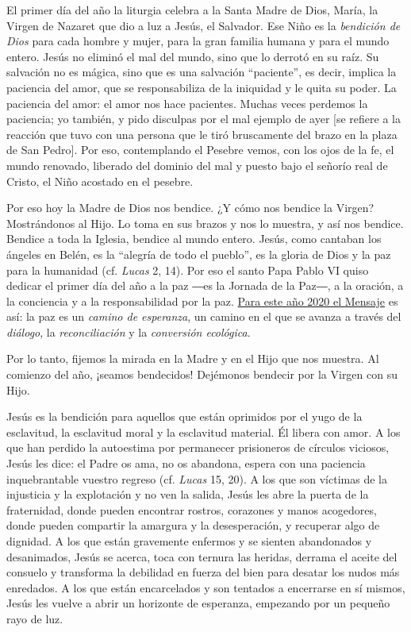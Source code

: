El primer día del año la liturgia celebra a la Santa Madre de Dios,
María, la Virgen de Nazaret que dio a luz a Jesús, el Salvador. Ese Niño
es la \emph{bendición de Dios} para cada hombre y mujer, para la gran
familia humana y para el mundo entero. Jesús no eliminó el mal del
mundo, sino que lo derrotó en su raíz. Su salvación no es mágica, sino
que es una salvación ``paciente'', es decir, implica la paciencia del
amor, que se responsabiliza de la iniquidad y le quita su poder. La
paciencia del amor: el amor nos hace pacientes. Muchas veces perdemos la
paciencia; yo también, y pido disculpas por el mal ejemplo de ayer {[}se
refiere a la reacción que tuvo con una persona que le tiró bruscamente
del brazo en la plaza de San Pedro{]}. Por eso, contemplando el Pesebre
vemos, con los ojos de la fe, el mundo renovado, liberado del dominio
del mal y puesto bajo el señorío real de Cristo, el Niño acostado en el
pesebre.

Por eso hoy la Madre de Dios nos bendice. ¿Y cómo nos bendice la Virgen?
Mostrándonos al Hijo. Lo toma en sus brazos y nos lo muestra, y así nos
bendice. Bendice a toda la Iglesia, bendice al mundo entero. Jesús, como
cantaban los ángeles en Belén, es la ``alegría de todo el pueblo'', es
la gloria de Dios y la paz para la humanidad (cf. \emph{Lucas} 2, 14).
Por eso el santo Papa Pablo VI quiso dedicar el primer día del año a la
paz ―es la Jornada de la Paz―, a la oración, a la conciencia y a la
responsabilidad por la paz.
\href{http://w2.vatican.va/content/francesco/es/messages/peace/documents/papa-francesco_20191208_messaggio-53giornatamondiale-pace2020.html}{Para
	este año 2020 el Mensaje} es así: la paz es un \emph{camino de
	esperanza}, un camino en el que se avanza a través del \emph{diálogo},
la \emph{reconciliación} y la \emph{conversión ecológica}.

Por lo tanto, fijemos la mirada en la Madre y en el Hijo que nos
muestra. Al comienzo del año, ¡seamos bendecidos! Dejémonos bendecir por
la Virgen con su Hijo.

Jesús es la bendición para aquellos que están oprimidos por el yugo de
la esclavitud, la esclavitud moral y la esclavitud material. Él libera
con amor. A los que han perdido la autoestima por permanecer prisioneros
de círculos viciosos, Jesús les dice: el Padre os ama, no os abandona,
espera con una paciencia inquebrantable vuestro regreso (cf.
\emph{Lucas} 15, 20). A los que son víctimas de la injusticia y la
explotación y no ven la salida, Jesús les abre la puerta de la
fraternidad, donde pueden encontrar rostros, corazones y manos
acogedores, donde pueden compartir la amargura y la desesperación, y
recuperar algo de dignidad. A los que están gravemente enfermos y se
sienten abandonados y desanimados, Jesús se acerca, toca con ternura las
heridas, derrama el aceite del consuelo y transforma la debilidad en
fuerza del bien para desatar los nudos más enredados. A los que están
encarcelados y son tentados a encerrarse en sí mismos, Jesús les vuelve
a abrir un horizonte de esperanza, empezando por un pequeño rayo de luz.

